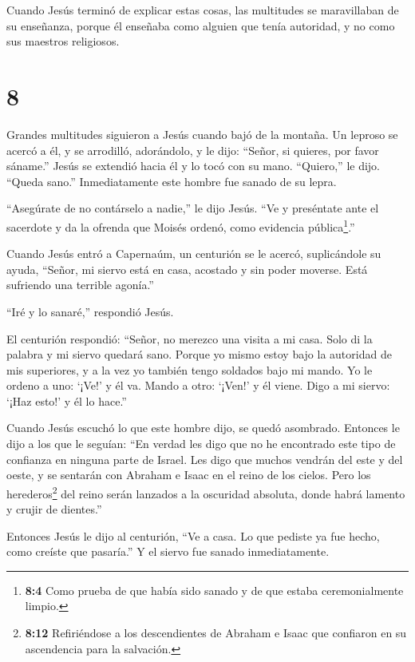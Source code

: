  Cuando Jesús terminó de explicar estas cosas, las
multitudes se maravillaban de su enseñanza,  porque él
enseñaba como alguien que tenía autoridad, y no como sus maestros
religiosos.

\hypertarget{section-7}{%
\section{8}\label{section-7}}

 Grandes multitudes siguieron a Jesús cuando bajó de la
montaña.  Un leproso se acercó a él, y se arrodilló,
adorándolo, y le dijo: ``Señor, si quieres, por favor sáname.''
 Jesús se extendió hacia él y lo tocó con su mano.
``Quiero,'' le dijo. ``Queda sano.'' Inmediatamente este hombre fue
sanado de su lepra.

 ``Asegúrate de no contárselo a nadie,'' le dijo Jesús. ``Ve
y preséntate ante el sacerdote y da la ofrenda que Moisés ordenó, como
evidencia pública\footnote{\textbf{8:4} Como prueba de que había sido
  sanado y de que estaba ceremonialmente limpio.}.''

 Cuando Jesús entró a Capernaúm, un centurión se le acercó,
suplicándole su ayuda,  ``Señor, mi siervo está en casa,
acostado y sin poder moverse. Está sufriendo una terrible agonía.''

 ``Iré y lo sanaré,'' respondió Jesús.

 El centurión respondió: ``Señor, no merezco una visita a mi
casa. Solo di la palabra y mi siervo quedará sano.  Porque
yo mismo estoy bajo la autoridad de mis superiores, y a la vez yo
también tengo soldados bajo mi mando. Yo le ordeno a uno: `¡Ve!' y él
va. Mando a otro: `¡Ven!' y él viene. Digo a mi siervo: `¡Haz esto!' y
él lo hace.''

 Cuando Jesús escuchó lo que este hombre dijo, se quedó
asombrado. Entonces le dijo a los que le seguían: ``En verdad les digo
que no he encontrado este tipo de confianza en ninguna parte de Israel.
 Les digo que muchos vendrán del este y del oeste, y se
sentarán con Abraham e Isaac en el reino de los cielos. 
Pero los herederos\footnote{\textbf{8:12} Refiriéndose a los
  descendientes de Abraham e Isaac que confiaron en su ascendencia para
  la salvación.} del reino serán lanzados a la oscuridad absoluta, donde
habrá lamento y crujir de dientes.''

 Entonces Jesús le dijo al centurión, ``Ve a casa. Lo que
pediste ya fue hecho, como creíste que pasaría.'' Y el siervo fue sanado
inmediatamente.

